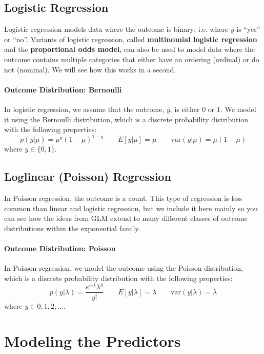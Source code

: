 \subsection{Logistic Regression}

Logistic regression models data where the outcome is binary; i.e. where $y$ is ``yes'' or ``no''. Variants of logistic regression, called \textbf{multinomial logistic regression} and the \textbf{proportional odds model}, can also be used to model data where the outcome contains multiple categories that either have an ordering (ordinal) or do not (nominal). We will see how this works in a second.

\paragraph{Outcome Distribution: Bernoulli} In logistic regression, we assume that the outcome, $y$, is either $0$ or $1$. We model it using the Bernoulli distribution, which is a discrete probability distribution with the following properties:
$$ p(y|\mu) = \mu^y (1 - \mu) ^ {1-y} \qquad E[y| \mu] = \mu \qquad \text{var}(y | \mu) = \mu (1 - \mu) $$
where $y \in \{0, 1\}$.

\subsection{Loglinear (Poisson) Regression}

In Poisson regression, the outcome is a count. This type of regression is less common than linear and logistic regression, but we include it here mainly so you can see how the ideas from GLM extend to many different classes of outcome distributions within the exponential family. 

\paragraph{Outcome Distribution: Poisson} In Poisson regression, we model the outcome using the Poisson distribution, which is a discrete probability distribution with the following properties:
$$ p(y | \lambda) = \frac{e^{-\lambda} \lambda^y}{y!} \qquad E[y|\lambda] = \lambda \qquad \text{var}(y|\lambda) = \lambda $$
where $y \in 0, 1, 2, \dots$.


\section{Modeling the Predictors}

